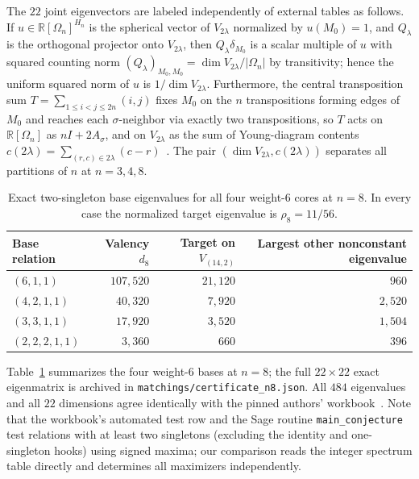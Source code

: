 \documentclass[11pt]{article}
\theoremstyle{remark}
\newcommand{\R}{\mathbb{R}}
\begin{document}
The $22$ joint eigenvectors are labeled independently of external tables as
follows. If $u \in \R[\Omega_n]^{H_n}$ is the spherical vector of $V_{2\lambda}$
normalized by $u(M_0) = 1$, and $Q_\lambda$ is the orthogonal projector onto
$V_{2\lambda}$, then $Q_\lambda \delta_{M_0}$ is a scalar multiple of $u$ with
squared counting norm $(Q_\lambda)_{M_0, M_0} = \dim V_{2\lambda} / |\Omega_n|$
by transitivity; hence the uniform squared norm of $u$ is
$1 / \dim V_{2\lambda}$. Furthermore, the central transposition sum
$T = \sum_{1 \le i < j \le 2n} (i,j)$ fixes $M_0$ on the $n$ transpositions
forming edges of $M_0$ and reaches each $\sigma$-neighbor via exactly two
transpositions, so $T$ acts on $\R[\Omega_n]$ as $nI + 2A_\sigma$, and on
$V_{2\lambda}$ as the sum of Young-diagram contents
$c(2\lambda) = \sum_{(r,c) \in 2\lambda} (c - r)$~\cite[Proposition~4.1]{GuptaEtAl}.
The pair $(\dim V_{2\lambda}, c(2\lambda))$ separates all partitions of $n$ at
$n = 3, 4, 8$.

\begin{table}[ht]
\centering
\caption{Exact two-singleton base eigenvalues for all four weight-$6$ cores at
$n = 8$. In every case the normalized target eigenvalue is $\rho_8 = 11/56$.}
\label{tab:n8}
\begin{tabular}{lrrr}
\toprule
Base relation & Valency $d_8$ & Target on $V_{(14,2)}$ & Largest other nonconstant eigenvalue \\
\midrule
$(6, 1, 1)$ & $107{,}520$ & $21{,}120$ & $960$ \\
$(4, 2, 1, 1)$ & $40{,}320$ & $7{,}920$ & $2{,}520$ \\
$(3, 3, 1, 1)$ & $17{,}920$ & $3{,}520$ & $1{,}504$ \\
$(2, 2, 2, 1, 1)$ & $3{,}360$ & $660$ & $396$ \\
\bottomrule
\end{tabular}
\end{table}

Table~\ref{tab:n8} summarizes the four weight-$6$ bases at $n = 8$; the full
$22 \times 22$ exact eigenmatrix is archived in
\texttt{matchings/certificate\_n8.json}. All $484$ eigenvalues and all $22$
dimensions agree identically with the pinned authors' workbook~\cite{GuptaRepo}.
Note that the workbook's automated test row and the Sage routine
\texttt{main\_conjecture} test relations with at least two singletons
(excluding the identity and one-singleton hooks) using signed maxima; our
comparison reads the integer spectrum table directly and determines all
maximizers independently.
\end{document}

